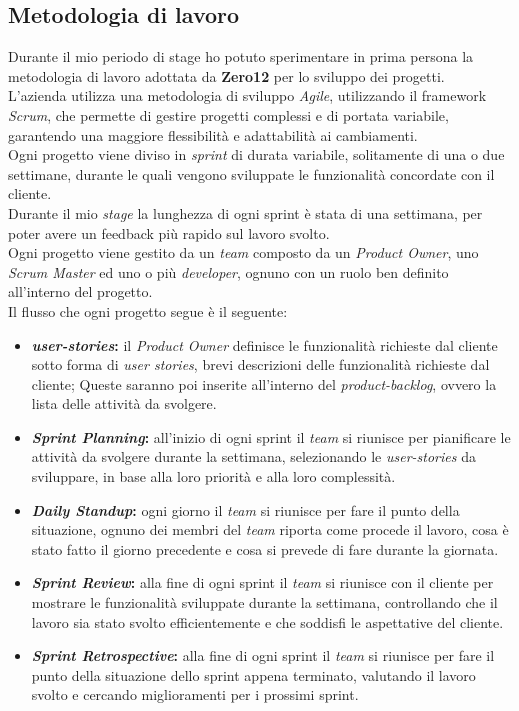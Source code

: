 \subsection{Metodologia di lavoro}
\label{sez:metodologia-lavoro}

Durante il mio periodo di stage ho potuto sperimentare in prima persona la metodologia di lavoro adottata da \textbf{Zero12} per lo sviluppo dei progetti.\\
L'azienda utilizza una metodologia di sviluppo \textit{Agile}, utilizzando il framework \textit{Scrum}, che permette di gestire progetti complessi e di portata variabile,
garantendo una maggiore flessibilità e adattabilità ai cambiamenti.\\
Ogni progetto viene diviso in \textit{sprint} di durata variabile, solitamente di una o due settimane, durante le quali vengono sviluppate le funzionalità concordate con il cliente.\\
Durante il mio \textit{stage} la lunghezza di ogni sprint è stata di una settimana, per poter avere un feedback più rapido sul lavoro svolto.\\
Ogni progetto viene gestito da un \textit{team} composto da un \textit{Product Owner}, uno \textit{Scrum Master} ed uno o più \textit{developer}, ognuno con un ruolo ben definito all'interno del progetto.\\

Il flusso che ogni progetto segue è il seguente:
\begin{itemize}
    \item \textbf{\textit{\gls{user-stories}}:} il \textit{Product Owner} definisce le funzionalità richieste dal cliente sotto forma di \textit{user stories}, brevi descrizioni delle funzionalità richieste dal cliente;
    Queste saranno poi inserite all'interno del \textit{\gls{product-backlog}}, ovvero la lista delle attività da svolgere.
    \item \textbf{\textit{Sprint Planning}:} all'inizio di ogni sprint il \textit{team} si riunisce per pianificare le attività da svolgere durante la settimana, selezionando le \textit{\gls{user-stories}} da sviluppare, 
    in base alla loro priorità e alla loro complessità.
    \item \textbf{\textit{Daily Standup}:} ogni giorno il \textit{team} si riunisce per fare il punto della situazione, ognuno dei membri del \textit{team} riporta come procede il lavoro,
    cosa è stato fatto il giorno precedente e cosa si prevede di fare durante la giornata.
    \item \textbf{\textit{Sprint Review}:} alla fine di ogni sprint il \textit{team} si riunisce con il cliente per mostrare le funzionalità sviluppate durante la settimana, controllando che il lavoro sia stato svolto efficientemente e 
    che soddisfi le aspettative del cliente.
    \item \textbf{\textit{Sprint Retrospective}:} alla fine di ogni sprint il \textit{team} si riunisce per fare il punto della situazione dello sprint appena terminato, valutando il lavoro svolto e cercando miglioramenti per i prossimi sprint.
\end{itemize}